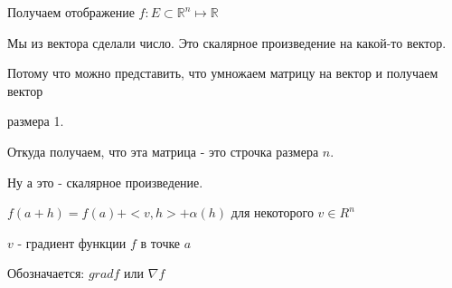 \begin{example}[Важный частный случай $m = 1$] \thmslashn
    
    Получаем отображение $f: E \subset \mathbb{R}^n \mapsto \mathbb{R}$

    Мы из вектора сделали число. Это скалярное произведение на какой-то вектор.

    Потому что можно представить, что умножаем матрицу на вектор и получаем вектор

    размера 1.

    Откуда получаем, что эта матрица - это строчка размера $n$.

    Ну а это - скалярное произведение.

    $f(a + h) = f(a) + <v, h> + \alpha(h)$ для некоторого $v \in R^n$

\end{example}

\begin{definition} \thmslashn

$v$ - градиент функции $f$ в точке $a$

Обозначается: $grad f$ или $\nabla f$ 

\end{definition}
    



